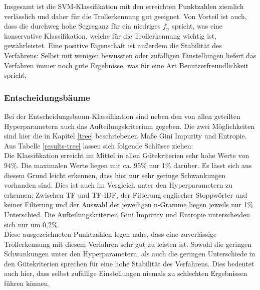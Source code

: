 Insgesamt ist die SVM-Klassifikation mit den erreichten Punktzahlen ziemlich verlässlich und daher für die Trollerkennung gut geeignet. Von Vorteil ist auch, dass die durchweg hohe Segreganz für ein niedriges $f_n$ spricht, was eine konservative Klassifikation, welche für die Trollerkennung wichtig ist, gewährleistet. Eine positive Eigenschaft ist außerdem die Stabilität des Verfahrens: Selbst mit wenigen bewussten oder zufälligen Einstellungen liefert das Verfahren immer noch gute Ergebnisse, was für eine Art Benutzerfreundlichkeit spricht.
\subsubsection{Entscheidungsbäume}
Bei der Entscheidungsbaum-Klassifikation sind neben den von allen geteilten Hyperparametern auch das Aufteilungskriterium gegeben. Die zwei Möglichkeiten sind hier die in Kapitel \ref{tree} beschriebenen Maße Gini Impurity und Entropie. Aus Tabelle \ref{results-tree} lassen sich folgende Schlüsse ziehen:\\
Die Klassifikation erreicht im Mittel in allen Gütekriterien sehr hohe Werte von 94\%. Die maximalen Werte liegen mit ca. 95\% nur 1\% darüber. Es lässt sich aus diesem Grund leicht erkennen, dass hier nur sehr geringe Schwankungen vorhanden sind. Dies ist auch im Vergleich unter den Hyperparametern zu erkennen: Zwischen TF und TF-IDF, der Filterung englischer Stoppwörter und keiner Filterung und der Auswahl der jeweiligen n-Gramme liegen jeweils nur 1\% Unterschied. Die Aufteilungskriterien Gini Impurity und Entropie unterscheiden sich nur um 0,2\%.\\
Diese ausgezeichneten Punktzahlen legen nahe, dass eine zuverlässige Trollerkennung mit diesem Verfahren sehr gut zu leisten ist. Sowohl die geringen Schwankungen unter den Hyperparametern, als auch die geringen Unterschiede in den Gütekriterien sprechen für eine hohe Stabilität des Verfahrens. Dies bedeutet auch hier, dass selbst zufällige Einstellungen niemals zu schlechten Ergebnissen führen können.\\
